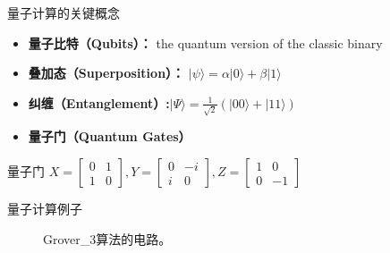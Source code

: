 \documentclass[aspectratio=1610]{ctexbeamer}
\begin{document}
\begin{frame}{量子计算的关键概念}
    \begin{itemize}[itemsep=18pt]
        \item \textbf{量子比特（Qubits）：} the quantum version of the classic binary
        \item \textbf{叠加态（Superposition）：} $|\psi\rangle = \alpha |0\rangle + \beta |1\rangle$
        \item \textbf{纠缠（Entanglement）:}$|\Psi\rangle = \frac{1}{\sqrt{2}}(|00\rangle+|11\rangle)$
        \item \textbf{量子门（Quantum Gates）} 
    \end{itemize}
\end{frame}
\begin{frame}{量子门}
    $X=\left[\begin{array}{rr}0 & 1 \\1 & 0 \end{array}\right],Y=\left[\begin{array}{rr}0 & -i \\i & 0 \end{array}\right],Z=\left[\begin{array}{rr}1 & 0 \\0 & -1 \end{array}\right]$ 
\end{frame}
\begin{frame}{量子计算例子}
    \begin{figure}[h]
      \centering
      \label{fig:cir}
      \caption{Grover\_3算法的电路。}
    \end{figure}
\end{frame}
\end{document}
